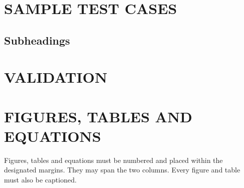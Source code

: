 \documentclass{article}
\begin{document}




\section{SAMPLE TEST CASES}
\label{sec:sampletestcases}


\subsection{Subheadings}
\label{ssec:subhead}

 

\section{VALIDATION}
\label{sec:validation}



\section{FIGURES, TABLES AND EQUATIONS}
\label{sec:floats}

Figures, tables and equations must be numbered and placed within the designated margins. They may span the two
columns. Every figure and table must also be captioned.
\end{document}
